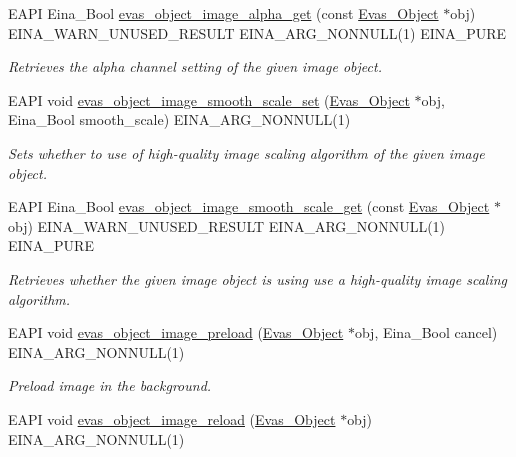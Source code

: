 \begin{DoxyCompactItemize}
EAPI Eina\_\-Bool \hyperlink{group__Evas__Object__Image_gac136f7f65d8529427b1f6da055b47a30}{evas\_\-object\_\-image\_\-alpha\_\-get} (const \hyperlink{group__Evas__Object__Group_ga9e19e6dd1f517a0ba437c0114d3e7c97}{Evas\_\-Object} $\ast$obj) EINA\_\-WARN\_\-UNUSED\_\-RESULT EINA\_\-ARG\_\-NONNULL(1) EINA\_\-PURE
\begin{DoxyCompactList}\small\item\em Retrieves the alpha channel setting of the given image object. \item\end{DoxyCompactList}\item 
EAPI void \hyperlink{group__Evas__Object__Image_ga670a0cf9176882f0ad339ccb4f37f510}{evas\_\-object\_\-image\_\-smooth\_\-scale\_\-set} (\hyperlink{group__Evas__Object__Group_ga9e19e6dd1f517a0ba437c0114d3e7c97}{Evas\_\-Object} $\ast$obj, Eina\_\-Bool smooth\_\-scale) EINA\_\-ARG\_\-NONNULL(1)
\begin{DoxyCompactList}\small\item\em Sets whether to use of high-\/quality image scaling algorithm of the given image object. \item\end{DoxyCompactList}\item 
EAPI Eina\_\-Bool \hyperlink{group__Evas__Object__Image_gae4acc1da719cb38122b92527df24388c}{evas\_\-object\_\-image\_\-smooth\_\-scale\_\-get} (const \hyperlink{group__Evas__Object__Group_ga9e19e6dd1f517a0ba437c0114d3e7c97}{Evas\_\-Object} $\ast$obj) EINA\_\-WARN\_\-UNUSED\_\-RESULT EINA\_\-ARG\_\-NONNULL(1) EINA\_\-PURE
\begin{DoxyCompactList}\small\item\em Retrieves whether the given image object is using use a high-\/quality image scaling algorithm. \item\end{DoxyCompactList}\item 
EAPI void \hyperlink{group__Evas__Object__Image_gad6383022c4013008d11827b32bf63d59}{evas\_\-object\_\-image\_\-preload} (\hyperlink{group__Evas__Object__Group_ga9e19e6dd1f517a0ba437c0114d3e7c97}{Evas\_\-Object} $\ast$obj, Eina\_\-Bool cancel) EINA\_\-ARG\_\-NONNULL(1)
\begin{DoxyCompactList}\small\item\em Preload image in the background. \item\end{DoxyCompactList}\item 
EAPI void \hyperlink{group__Evas__Object__Image_ga764bec190c0812f61f5a18f38c9c6a4e}{evas\_\-object\_\-image\_\-reload} (\hyperlink{group__Evas__Object__Group_ga9e19e6dd1f517a0ba437c0114d3e7c97}{Evas\_\-Object} $\ast$obj) EINA\_\-ARG\_\-NONNULL(1)

\end{DoxyCompactItemize}
